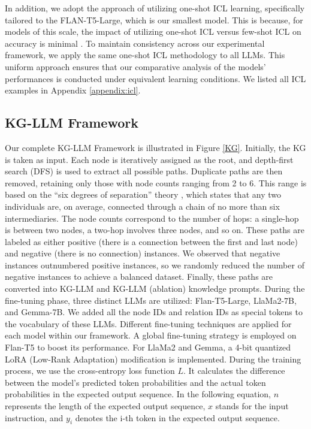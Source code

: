 \documentclass[pmlr]{jmlr}%
\begin{document}
In addition, we adopt the approach of utilizing one-shot ICL learning, specifically tailored to the FLAN-T5-Large, which is our smallest model. This is because, for models of this scale, the impact of utilizing one-shot ICL versus few-shot ICL on accuracy is minimal \citep{brown2020language}. To maintain consistency across our experimental framework, we apply the same one-shot ICL methodology to all LLMs. This uniform approach ensures that our comparative analysis of the models' performances is conducted under equivalent learning conditions. We listed all ICL examples in Appendix \ref{appendix:icl}.


\subsection{KG-LLM Framework}
\label{KG-LLM_Framework}
Our complete KG-LLM Framework is illustrated in Figure \ref{KG}. Initially, the KG is taken as input. Each node is iteratively assigned as the root, and depth-first search (DFS) is used to extract all possible paths. Duplicate paths are then removed, retaining only those with node counts ranging from 2 to 6. This range is based on the ``six degrees of separation'' theory \citep{guare2016six}, which states that any two individuals are, on average, connected through a chain of no more than six intermediaries. The node counts correspond to the number of hops: a single-hop is between two nodes, a two-hop involves three nodes, and so on. These paths are labeled as either positive (there is a connection between the first and last node) and negative (there is no connection) instances. We observed that negative instances outnumbered positive instances, so we randomly reduced the number of negative instances to achieve a balanced dataset. Finally, these paths are converted into KG-LLM and KG-LLM (ablation) knowledge prompts. During the fine-tuning phase, three distinct LLMs are utilized: Flan-T5-Large, LlaMa2-7B, and Gemma-7B. We added all the node IDs and relation IDs as special tokens to the vocabulary of these LLMs. Different fine-tuning techniques are applied for each model within our framework. A global fine-tuning strategy is employed on Flan-T5 to boost its performance. For LlaMa2 and Gemma, a 4-bit quantized LoRA (Low-Rank Adaptation) modification \citep{hu2021lora} is implemented. During the training process, we use the cross-entropy loss function $L$. It calculates the difference between the model's predicted token probabilities and the actual token probabilities in the expected output sequence. In the following equation, $n$ represents the length of the expected output sequence, $x$ stands for the input instruction, and $y_i$ denotes the i-th token in the expected output sequence. 
\end{document}
